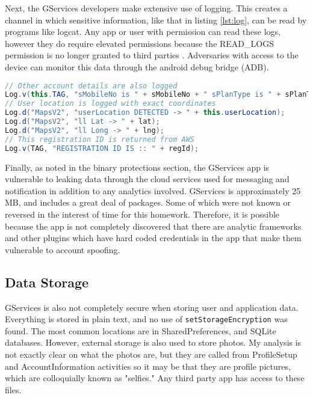 \documentclass[conference,compsoc]{IEEEtran}
\begin{document}
Next, the GServices developers make extensive use of logging. This creates a channel in which sensitive information, like that in listing \ref{lst:log}, can be read by programs like logcat. Any app or user with permission can read these logs, however they do require elevated permissions because the READ\_LOGS permission is no longer granted to third parties \cite{Google:readlog}. Adversaries with access to the device can monitor this data through the android debug bridge (ADB). 

\begin{lstlisting}[language=Java, caption=A small sample of GServices leaking data through logs, label={lst:log}]
// Other account details are also logged
Log.v(this.TAG, "sMobileNo is " + sMobileNo + " sPlanType is " + sPlanType);
// User location is logged with exact coordinates
Log.d("MapsV2", "userLocation DETECTED -> " + this.userLocation);
Log.d("MapsV2", "ll Lat -> " + lat);
Log.d("MapsV2", "ll Long -> " + lng);
// This registration ID is returned from AWS
Log.v(TAG, "REGISTRATION ID IS :: " + regId);
\end{lstlisting}

Finally, as noted in the binary protections section, the GServices app is vulnerable to leaking data through the cloud services used for messaging and notification in addition to any analytics involved. GServices is approximately 25 MB, and includes a great deal of packages. Some of which were not known or reversed in the interest of time for this homework. Therefore, it is possible because the app is not completely discovered that there are analytic frameworks and other plugins which have hard coded credentials in the app that make them vulnerable to account spoofing.


\subsection{Data Storage}
GServices is also not completely secure when storing user and application data. Everything is stored in plain text, and no use of \texttt{setStorageEncryption} \cite{Google:storageEncryption} was found. The most common locations are in SharedPreferences, and SQLite databases. However, external storage is also used to store photos. My analysis is not exactly clear on what the photos are, but they are called from ProfileSetup and AccountInformation activities so it may be that they are profile pictures, which are colloquially known as "selfies." Any third party app has access to these files.
\end{document}
